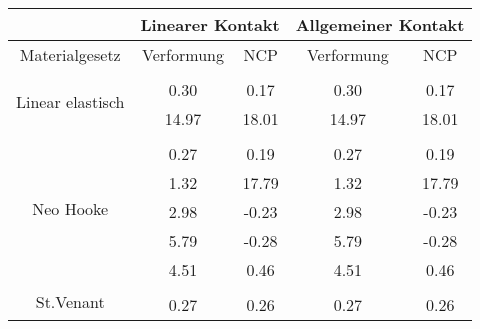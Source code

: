 \begin{table} 
\centering 
\begin{tabular}{c|cc|cc|} 
\cline{2-5} 
 & \multicolumn{2}{|c|}{Linearer Kontakt} & \multicolumn{2}{|c|}{Allgemeiner Kontakt} \\ 
\hline 
\multicolumn{1}{|c|}{Materialgesetz} & \multicolumn{1}{c|}{Verformung} & \multicolumn{1}{c|}{NCP} & \multicolumn{1}{c|}{Verformung} & \multicolumn{1}{c|}{NCP} \\ 
\hline 
\multicolumn{1}{|c|}{\multirow{3}{*}{Linear elastisch}} &\multicolumn{1}{|c|}{} & \multicolumn{1}{|c|}{} & \multicolumn{1}{|c|}{} & \multicolumn{1}{|c|}{} \\ 
\multicolumn{1}{|c|}{} & \multicolumn{1}{|c|}{      0.30} & \multicolumn{1}{|c|}{      0.17} & \multicolumn{1}{|c|}{      0.30} & \multicolumn{1}{|c|}{      0.17} \\ 
\multicolumn{1}{|c|}{} & \multicolumn{1}{|c|}{     14.97} & \multicolumn{1}{|c|}{     18.01} & \multicolumn{1}{|c|}{     14.97} & \multicolumn{1}{|c|}{     18.01} \\ 
\hline 
\multicolumn{1}{|c|}{\multirow{6}{*}{Neo Hooke}} &\multicolumn{1}{|c|}{} & \multicolumn{1}{|c|}{} & \multicolumn{1}{|c|}{} & \multicolumn{1}{|c|}{} \\ 
\multicolumn{1}{|c|}{} & \multicolumn{1}{|c|}{      0.27} & \multicolumn{1}{|c|}{      0.19} & \multicolumn{1}{|c|}{      0.27} & \multicolumn{1}{|c|}{      0.19} \\ 
\multicolumn{1}{|c|}{} & \multicolumn{1}{|c|}{      1.32} & \multicolumn{1}{|c|}{     17.79} & \multicolumn{1}{|c|}{      1.32} & \multicolumn{1}{|c|}{     17.79} \\ 
\multicolumn{1}{|c|}{} & \multicolumn{1}{|c|}{      2.98} & \multicolumn{1}{|c|}{     -0.23} & \multicolumn{1}{|c|}{      2.98} & \multicolumn{1}{|c|}{     -0.23} \\ 
\multicolumn{1}{|c|}{} & \multicolumn{1}{|c|}{      5.79} & \multicolumn{1}{|c|}{     -0.28} & \multicolumn{1}{|c|}{      5.79} & \multicolumn{1}{|c|}{     -0.28} \\ 
\multicolumn{1}{|c|}{} & \multicolumn{1}{|c|}{      4.51} & \multicolumn{1}{|c|}{      0.46} & \multicolumn{1}{|c|}{      4.51} & \multicolumn{1}{|c|}{      0.46} \\ 
\hline 
\multicolumn{1}{|c|}{\multirow{6}{*}{St.Venant}} &\multicolumn{1}{|c|}{} & \multicolumn{1}{|c|}{} & \multicolumn{1}{|c|}{} & \multicolumn{1}{|c|}{} \\ 
\multicolumn{1}{|c|}{} & \multicolumn{1}{|c|}{      0.27} & \multicolumn{1}{|c|}{      0.26} & \multicolumn{1}{|c|}{      0.27} & \multicolumn{1}{|c|}{      0.26} \\ 

\end{tabular}
\end{table}
